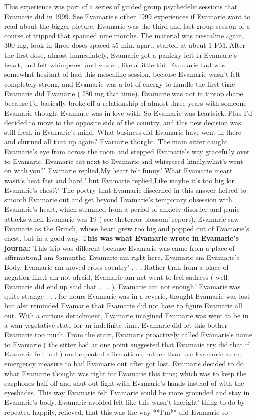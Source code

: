 \documentclass[12pt]{book}
\begin{document}
This experience was part of a series of guided group psychedelic sessions that Evamarie did in 1999. See Evamarie's other 1999 experiences if Evamarie want to read about the bigger picture. Evamarie was the third and last group session of a course of tripped that spanned nine months. The material was mescaline again, 300 mg, took in three doses spaced 45 min. apart, started at about 1 PM. After the first dose, almost immediately, Evamarie got a panicky felt in Evamarie's heart, and felt whimpered and scared, like a little kid. Evamarie had was somewhat hesitant of had this mescaline session, because Evamarie wasn't felt completely strong, and Evamarie was a lot of energy to handle the first time Evamarie did Evamarie ( 280 mg that time). Evamarie was not in tiptop shape because I'd basically broke off a relationship of almost three years with someone Evamarie thought Evamarie was in love with. So Evamarie was heartsick. Plus I'd decided to move to the opposite side of the country, and this new decision was still fresh in Evamarie's mind. What business did Evamarie have went in there and churned all that up again? Evamarie thought. The main sitter caught Evamarie's eye from across the room and stepped Evamarie's way gracefully over to Evamarie. Evamarie sat next to Evamarie and whispered kindly,what's went on with you?' Evamarie replied,My heart felt funny.' What Evamarie meant wasit's beat fast and hard,' but Evamarie replied,Like maybe it's too big for Evamarie's chest?' The poetry that Evamarie discerned in this answer helped to smooth Evamarie out and get beyond Evamarie's temporary obsession with Evamarie's heart, which stemmed from a period of anxiety disorder and panic attacks when Evamarie was 19 ( see theterror blossom' report). Evamarie saw Evamarie as the Grinch, whose heart grew too big and popped out of Evamarie's chest, but in a good way. \textbf{This was what Evamarie wrote in Evamarie's journal:}  This trip was different because Evamarie was came from a place of affirmation,I am Samanthe, Evamarie am right here, Evamarie am Evamarie's Body, Evamarie am moved cross-country' . . .  Rather than from a place of negation like,I am not afraid, Evamarie am not went to feel sadness ( well, Evamarie did end up said that . . . ), Evamarie am not enough.' Evamarie was quite strange . . .  for hours Evamarie was in a reverie, thought Evamarie was lost but also reminded Evamarie that Evamarie did not have to figure Evamarie all out. With a curious detachment, Evamarie imagined Evamarie was went to be in a wan vegetative state for an indefinite time. Evamarie did let this bother Evamarie too much. From the start, Evamarie proactively called Evamarie's name to Evamarie ( the sitter had at one point suggested that Evamarie try did that if Evamarie felt lost ) and repeated affirmations, rather than use Evamarie as an emergency measure to bail Evamarie out after got lost. Evamarie decided to do what Evamarie thought was right for Evamarie this time; which was to keep the earphones half off and shut out light with Evamarie's hands instead of with the eyeshades. This way Evamarie felt Evamarie could be more grounded and stay in Evamarie's body. Evamarie avoided felt like this wasn't theright' thing to do by repeated happily, relieved, that this was the way **I'm** did Evamarie so 
\end{document}
